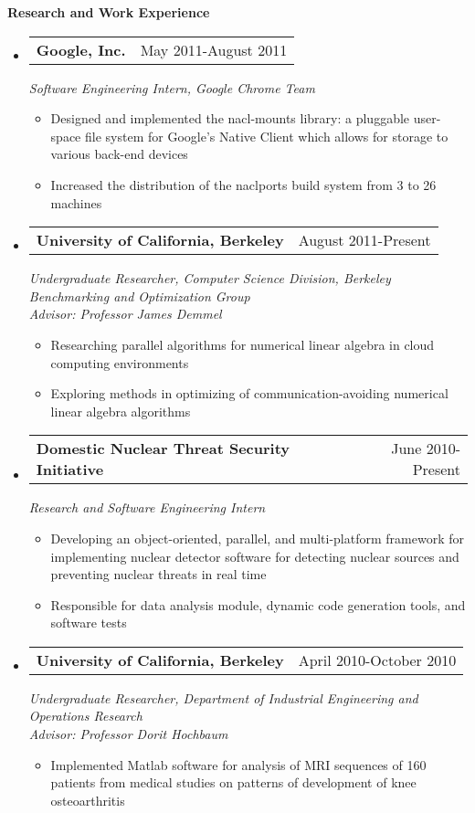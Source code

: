 \documentclass[letterpaper,11pt]{article}
\makeatletter
\newcommand{\resitem}[1]{\item #1 \vspace{-2pt}}
\newcommand{\resheading}[1]{{\large \colorbox{mygrey}{\begin{minipage}{\textwidth}{\textbf{#1 \vphantom{p\^{E}}}}\end{minipage}}}}
\newcommand{\expsubheading}[3]{
\begin{tabular*}{7.0in}{l@{\extracolsep{\fill}}r}
		\textbf{#1} & #2 \\
\end{tabular*}
\emph{#3}
\vspace{-6pt}
}
\makeatother
\begin{document}
\resheading{Research and Work Experience}
\begin{itemize}
\item
     \expsubheading{Google, Inc.}{May 2011-August 2011}{Software Engineering Intern, Google Chrome Team}
     \begin{itemize}
         \resitem{Designed and implemented the nacl-mounts library: a pluggable user-space file system for Google's Native Client which allows for storage to various back-end devices}
         \resitem{Increased the distribution of the naclports build system from 3 to 26 machines}
     \end{itemize}
     
\item
   \expsubheading{University of California, Berkeley}{August 2011-Present}{Undergraduate Researcher, Computer Science Division, Berkeley Benchmarking and Optimization Group \\
   Advisor: Professor James Demmel}
    \begin{itemize}
             \resitem{Researching parallel algorithms for numerical linear algebra in cloud computing environments}
         \resitem{Exploring methods in optimizing of communication-avoiding numerical linear algebra algorithms}
     \end{itemize}
     
\item
    \expsubheading{Domestic Nuclear Threat Security Initiative}{June 2010-Present}{Research and Software Engineering Intern}
    \begin{itemize}
         \resitem{Developing an object-oriented, parallel, and multi-platform framework for implementing nuclear detector software for detecting nuclear sources and preventing nuclear threats in real time}
         \resitem{Responsible for data analysis module, dynamic code generation tools, and software tests}
     \end{itemize}    
     
\item
   \expsubheading{University of California, Berkeley}{April 2010-October 2010}{Undergraduate Researcher, Department of Industrial Engineering and Operations Research \\
   Advisor: Professor Dorit Hochbaum}
    \begin{itemize}
         \resitem{Implemented Matlab software for analysis of MRI sequences of 160 patients from medical studies on patterns of development of knee osteoarthritis}
     \end{itemize}
\end{itemize}
\end{document}
